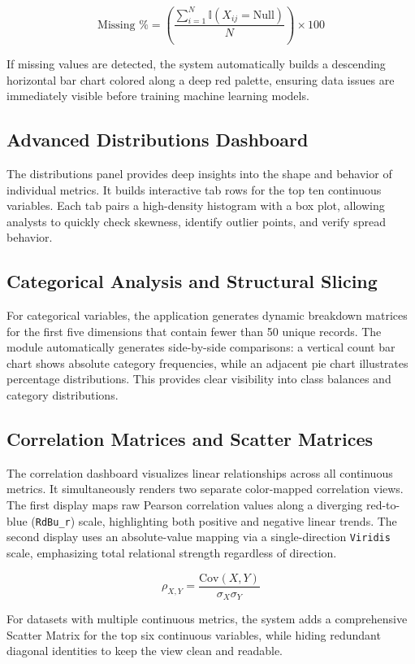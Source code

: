 \documentclass[11pt,a4paper,titlepage]{article}
\begin{document}
$$\text{Missing } \% = \left( \frac{\sum_{i=1}^{N} \mathbb{I}(X_{ij} = \text{Null})}{N} \right) \times 100$$

If missing values are detected, the system automatically builds a descending horizontal bar chart colored along a deep red palette, ensuring data issues are immediately visible before training machine learning models.

\subsection{Advanced Distributions Dashboard}
The distributions panel provides deep insights into the shape and behavior of individual metrics. It builds interactive tab rows for the top ten continuous variables. Each tab pairs a high-density histogram with a box plot, allowing analysts to quickly check skewness, identify outlier points, and verify spread behavior.

\subsection{Categorical Analysis and Structural Slicing}
For categorical variables, the application generates dynamic breakdown matrices for the first five dimensions that contain fewer than 50 unique records. The module automatically generates side-by-side comparisons: a vertical count bar chart shows absolute category frequencies, while an adjacent pie chart illustrates percentage distributions. This provides clear visibility into class balances and category distributions.

\subsection{Correlation Matrices and Scatter Matrices}
The correlation dashboard visualizes linear relationships across all continuous metrics. It simultaneously renders two separate color-mapped correlation views. The first display maps raw Pearson correlation values along a diverging red-to-blue (\texttt{RdBu\_r}) scale, highlighting both positive and negative linear trends. The second display uses an absolute-value mapping via a single-direction \texttt{Viridis} scale, emphasizing total relational strength regardless of direction.

$$\rho_{X,Y} = \frac{\text{Cov}(X,Y)}{\sigma_X \sigma_Y}$$

For datasets with multiple continuous metrics, the system adds a comprehensive Scatter Matrix for the top six continuous variables, while hiding redundant diagonal identities to keep the view clean and readable.
\end{document}
